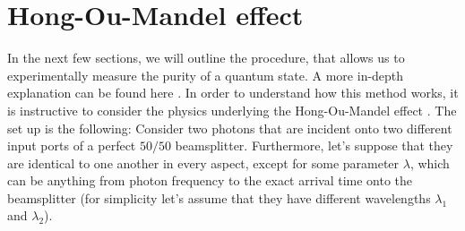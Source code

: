 \section{Hong-Ou-Mandel effect}
In the next few sections, we will outline the procedure, that allows us to experimentally measure the purity of a quantum state. A more in-depth explanation can be found here \cite{PreissThesis}. In order to understand how this method works, it is instructive to consider the physics underlying the Hong-Ou-Mandel effect \cite{Hong1987}. The set up is the following: Consider two photons that are incident onto two different input ports of a perfect $50/50$ beamsplitter. Furthermore, let's suppose that they are identical to one another in every aspect, except for some parameter $\lambda$, which can be anything from photon frequency to the exact arrival time onto the beamsplitter (for simplicity let's assume that they have different wavelengths $\lambda_1$ and $\lambda_2$).

